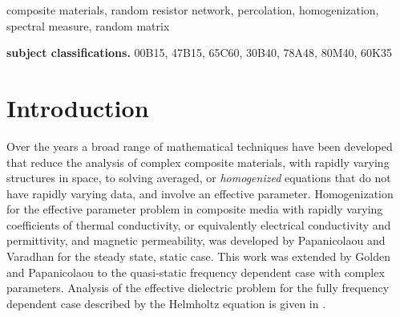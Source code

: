 \documentclass{cmslatex}
\begin{document}
\begin{keywords}
composite materials, random resistor network, percolation,
homogenization, spectral measure, random matrix 
\smallskip

{\bf subject classifications.}
00B15,
47B15,
65C60,
30B40,
78A48,
80M40,
60K35
\end{keywords}


\section{Introduction}\label{Introduction}
%
Over the years a broad range of mathematical techniques have been
developed that reduce the analysis of complex composite materials,
with rapidly varying structures in space, to solving averaged, or
\emph{homogenized} equations that do not have rapidly varying data,
and involve an effective parameter. Homogenization for the effective
parameter problem in composite media with rapidly varying coefficients
of thermal conductivity, or equivalently \cite{MILTON:2002:TC}
electrical conductivity and permittivity, and magnetic permeability,
was developed by Papanicolaou and Varadhan \cite{Papanicolaou:RF-835}
for the steady state, static case. This work was extended
\cite{Golden:CMP-473,Golden:JSP-655} by Golden and Papanicolaou to the
quasi-static frequency dependent case with complex
parameters. Analysis of the effective dielectric problem for the fully
frequency dependent case described by the Helmholtz equation is given
in \cite{Simeonova:MMS:1113}. 
\end{document}
